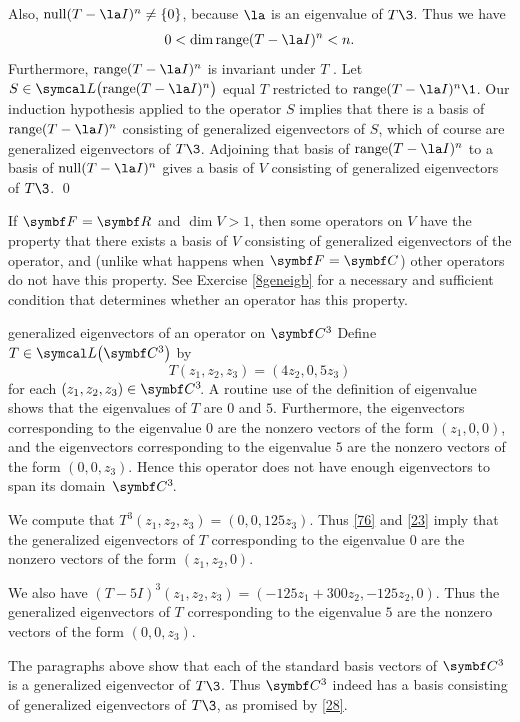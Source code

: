 Also, $\ker(T - \la I)^n \ne \br{0}$, because $\la$ is an eigenvalue of $T\3$. Thus we have
\[
0 < \dim \ran(T - \la I)^n < n.
\]
Furthermore,
$\ran(T - \la I)^n$ is invariant under $T$ .
Let $S \in \L\paren[\big]{ \ran(T - \la I)^n }$ equal $T$
restricted to $\ran(T - \la I)^n\1$. Our induction hypothesis applied to the operator $S$ implies that there is a basis of $\ran(T - \la I)^n$ consisting of generalized eigenvectors of $S$, which of course are generalized eigenvectors of $T\3$. Adjoining that basis of $\ran(T - \la I)^n$ to a basis of $\ker(T - \la I)^n$ gives a basis of $V$ consisting of generalized eigenvectors of $T\3$.
\qed

If $\F{} = \R{}$ and $\dim V > 1$, then some operators on $V$ have the property that there exists a basis of $V$ consisting of generalized eigenvectors of the operator, and (unlike what happens when $\F{}=\C{}$) other operators do not have this property. See Exercise \ref{8geneigb} for a necessary and sufficient condition that determines whether an operator has this property.

\begin{example}[8exgeneig]{generalized eigenvectors of an operator on\/ $\C3$}
Define $T \in \L\paren[\big]{\C{3}}$ by
\[
T(z_1, z_2, z_3) = (4z_2, 0, 5z_3)
\]
for each $(z_1, z_2, z_3) \in \CC3$. A routine use of the definition of eigenvalue shows that the eigenvalues of $T$ are $0$ and $5$. Furthermore, the eigenvectors corresponding to the eigenvalue $0$ are the nonzero vectors of the form $(z_1, 0, 0)$, and the eigenvectors corresponding to the eigenvalue $5$ are the nonzero vectors of the form $(0, 0, z_3)$. Hence this operator does not have enough eigenvectors to span its domain~$\CC3$.

We compute that $T^3(z_1, z_2, z_3) = (0, 0, 125 z_3)$. Thus \ref{76} and \ref{23} imply that the generalized eigenvectors of $T$ corresponding to the eigenvalue $0$ are the nonzero vectors of the form $(z_1, z_2, 0)$.

We also have $(T-5I)^3(z_1, z_2, z_3) = (-125z_1 + 300z_2, -125z_2, 0)$. Thus the generalized eigenvectors of $T$ corresponding to the eigenvalue $5$ are the nonzero vectors of the form $(0,0,z_3)$.

The paragraphs above show that each of the standard basis vectors of $\C3$ is a generalized eigenvector of $T\3$. Thus $\C3$ indeed has a basis consisting of generalized eigenvectors of $T\3$, as promised by \ref{28}.
\end{example}

